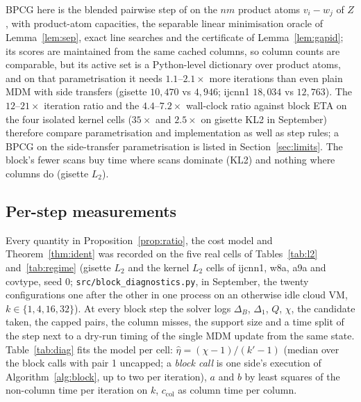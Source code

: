 BPCG here is the blended pairwise step of \citet{tsuji2022} on the
$nm$ product atoms $v_i-w_j$ of $Z$, with product-atom capacities, the separable linear minimisation oracle of Lemma~\ref{lem:sep}, exact line searches and the
certificate of Lemma~\ref{lem:gapid}; its scores are maintained from
the same cached columns, so column counts are comparable, but its
active set is a Python-level dictionary over product atoms, and on that
parametrisation it needs $1.1$--$2.1\times$ more iterations than even
plain MDM with side transfers (gisette $10{,}470$ vs $4{,}946$; ijcnn1
$18{,}034$ vs $12{,}763$). The $12$--$21\times$ iteration ratio and the $4.4$--$7.2\times$
wall-clock ratio against block ETA on the four isolated kernel cells
($35\times$ and $2.5\times$ on gisette KL2 in September) therefore compare
parametrisation and implementation as well as step rules; a BPCG on the
side-transfer parametrisation is listed in Section~\ref{sec:limits}.
The block's fewer scans buy time where scans dominate (KL2) and nothing
where columns do (gisette $L_2$).

\subsection{Per-step measurements}\label{sec:meas}

Every quantity in Proposition~\ref{prop:ratio}, the cost model and
Theorem~\ref{thm:ident} was recorded on the five real cells of
Tables~\ref{tab:l2} and~\ref{tab:regime} (gisette $L_2$ and the kernel
$L_2$ cells of ijcnn1, w8a, a9a and covtype, seed 0;
\texttt{src/block\_diagnostics.py}, in September, the twenty
configurations one after the other in one process on an otherwise idle
cloud VM, $k\in\{1,4,16,32\}$). At every block step the
solver logs $\Delta_B$, $\Delta_1$, $Q$, $\chi$, the candidate taken,
the capped pairs, the column misses, the support size and a time split
of the step next to a dry-run timing of the single MDM update from the
same state. Table~\ref{tab:diag} fits the model per cell:
$\hat\eta=(\chi-1)/(k'-1)$ (median over the block calls with pair 1
uncapped; a \emph{block call} is one side's execution of
Algorithm~\ref{alg:block}, up to two per iteration), $a$ and $b$ by
least squares of the non-column time per iteration on $k$,
$c_{\mathrm{col}}$ as column time per column.

